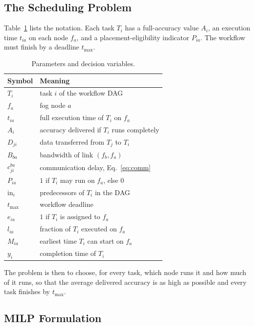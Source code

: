 \documentclass[conference]{IEEEtran}
\begin{document}
\subsection{The Scheduling Problem}

Table~\ref{tab:notation} lists the notation. Each task $T_i$ has a full-accuracy value $A_i$, an execution time $t_{ia}$ on each node $f_a$, and a placement-eligibility indicator $P_{ia}$. The workflow must finish by a deadline $t_{\max}$.

\begin{table}[t]
\centering
\caption{Parameters and decision variables.}
\label{tab:notation}
\small
\begin{tabular}{ll}
\toprule
\textbf{Symbol} & \textbf{Meaning} \\
\midrule
$T_i$ & task $i$ of the workflow DAG \\
$f_a$ & fog node $a$ \\
$t_{ia}$ & full execution time of $T_i$ on $f_a$ \\
$A_i$ & accuracy delivered if $T_i$ runs completely \\
$D_{ji}$ & data transferred from $T_j$ to $T_i$ \\
$B_{ba}$ & bandwidth of link $(f_b,f_a)$ \\
$c_{ji}^{ba}$ & communication delay, Eq.~\eqref{eq:comm} \\
$P_{ia}$ & $1$ if $T_i$ may run on $f_a$, else $0$ \\
$\mathrm{in}_i$ & predecessors of $T_i$ in the DAG \\
$t_{\max}$ & workflow deadline \\
\midrule
$e_{ia}$ & $1$ if $T_i$ is assigned to $f_a$ \\
$l_{ia}$ & fraction of $T_i$ executed on $f_a$ \\
$M_{ia}$ & earliest time $T_i$ can start on $f_a$ \\
$y_i$ & completion time of $T_i$ \\
\bottomrule
\end{tabular}
\end{table}

The problem is then to choose, for every task, which node runs it and how much of it runs, so that the average delivered accuracy is as high as possible and every task finishes by $t_{\max}$.

\subsection{MILP Formulation}
\label{sec:milp}
\end{document}

